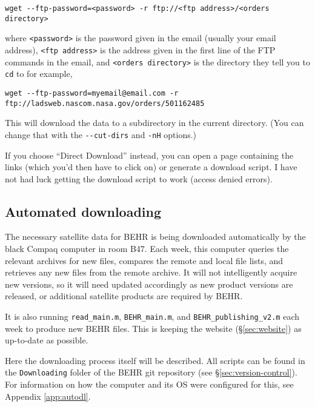 \documentclass[12pt]{article}
\begin{document}
\begin{itemize}
\begin{lstlisting}[basicstyle=\scriptsize\ttfamily]
wget --ftp-password=<password> -r ftp://<ftp address>/<orders directory>
\end{lstlisting}
		
where \lstinline$<password>$ is the password given in the email (usually your email address), \lstinline$<ftp address>$ is the address given in the first line of the FTP commands in the email, and \lstinline$<orders directory>$ is the directory they tell you to \lstinline$cd$ to for example,

\begin{lstlisting}[basicstyle=\scriptsize\ttfamily]
wget --ftp-password=myemail@email.com -r ftp://ladsweb.nascom.nasa.gov/orders/501162485
\end{lstlisting}

This will download the data to a  subdirectory in the current directory. (You can change that with the \lstinline$--cut-dirs$ and \lstinline$-nH$ options.)
		
		If you choose ``Direct Download'' instead, you can open a page containing the links (which you'd then have to click on) or generate a download script. I have not had luck getting the download script to work (access denied errors).
		
	\end{itemize}


	\subsection{Automated downloading}
	
		The necessary satellite data for BEHR is being downloaded automatically by the black Compaq computer in room B47. Each week, this computer queries the relevant archives for new files, compares the remote and local file lists, and retrieves any new files from the remote archive.  It will not intelligently acquire new versions, so it will need updated accordingly as new product versions are released, or additional satellite products are required by BEHR.
		
		It is also running \lstinline$read_main.m$, \lstinline$BEHR_main.m$, and \lstinline$BEHR_publishing_v2.m$ each week to produce new BEHR files. This is keeping the website (\S\ref{sec:website}) as up-to-date as possible.
		
		Here the downloading process itself will be described. All scripts can be found in the \texttt{Downloading} folder of the BEHR git repository (see \S\ref{sec:version-control}).  For information on how the computer and its OS were configured for this, see Appendix \ref{app:autodl}.
		
\end{document}
